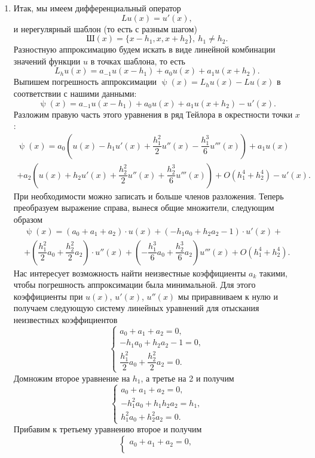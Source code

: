 \documentclass[a4paper, 12pt]{article}
\renewcommand{\psi}{\uppsi}
\begin{document}
\begin{enumerate}
	\newpage
	\item 
	\hypertarget{t3}{}
	Итак, мы имеем дифференциальный оператор $$Lu(x) = u'(x),$$ и нерегулярный шаблон (то есть с разным шагом) $$\text{Ш}(x) = \{x-h_1, x, x+h_2\},\ h_1 \ne h_2.$$ Разностную аппроксимацию будем искать в виде линейной комбинации значений функции $u$ в точках шаблона, то есть $$L_h u(x) = a_{-1} u(x-h_1) + a_0 u(x) + a_1 u(x+h_2).$$ Выпишем погрешность аппроксимации $\psi(x) = L_h u(x) - L u(x)$ в соответствии с нашими данными: $$\psi(x) = a_{-1} u(x-h_1) + a_0 u(x) + a_1 u(x+h_2) - u'(x).$$
	Разложим правую часть этого уравнения в ряд Тейлора в окрестности точки $x$:
	\begin{multline*}
		\psi(x) = a_0\left(u(x) - h_1u'(x) + \dfrac{h_1^2}{2}u''(x)-\dfrac{h_1^3}{6}u'''(x)\right) + a_1 u(x)\\+ a_2 \left(u(x) + h_2 u'(x) + \dfrac{h_2^2}{2}u''(x) +\dfrac{h_2^3}{6}u'''(x)\right) + O(h_1^4+h_2^4) - u'(x) .
	\end{multline*}
	При необходимости можно записать и больше членов разложения. Теперь преобразуем выражение справа, вынеся общие множители, следующим образом
	\begin{multline*}
		\psi(x) = (a_0 + a_1 + a_2)\cdot u(x) + (-h_1a_{0} + h_2a_2 - 1)\cdot  u'(x) +\\+ \left(\dfrac{h_1^2}{2}a_{0} + \dfrac{h_2^2}{2}a_2\right)\cdot u''(x) + \left(-\dfrac{h_1^3}{6}a_{0} + \dfrac{h_2^3}{6}a_2\right)u'''(x)+O(h_1^4+h_2^4).
	\end{multline*}
	Нас интересует возможность найти неизвестные коэффициенты $a_k$ такими, чтобы погрешность аппроксимации была минимальной. Для этого коэффициенты при $u(x)$, $u'(x)$, $u''(x)$ мы приравниваем к нулю и получаем следующую систему линейных уравнений для отыскания неизвестных коэффициентов 
	$$\begin{cases}
		a_0 + a_1 + a_2= 0,\\
		-h_1a_{0} + h_2a_2 - 1= 0,\\
		\dfrac{h_1^2}{2}a_{0} + \dfrac{h_2^2}{2}a_2 = 0.
	\end{cases}$$
	Домножим второе уравнение на $h_1$, а третье на 2 и получим
	$$\begin{cases}
		a_0 + a_1 + a_2= 0,\\
		-h_1^2 a_{0}+ h_1h_2 a_2= h_1,\\
		h_1^2 a_{0} + h_2^2a_2 = 0.
	\end{cases}$$
	Прибавим к третьему уравнению второе и получим
	$$\begin{cases}
		a_0 + a_1 + a_2= 0,\\

\end{cases}$$
\end{enumerate}
\end{document}
